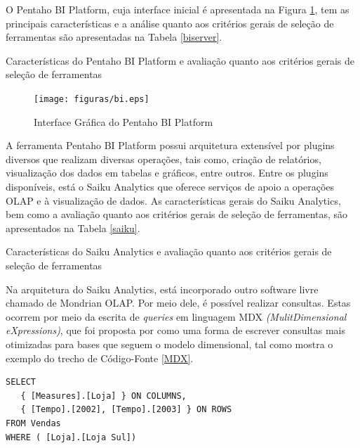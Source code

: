 O Pentaho BI Platform, cuja interface inicial é apresentada na Figura \ref{BIplatform}, tem as principais características e a análise quanto aos critérios gerais de seleção de ferramentas são apresentadas na Tabela \ref{biserver}. 


\begin{table}[!ht]

\caption{Características do Pentaho BI Platform e avaliação quanto aos critérios gerais de seleção de ferramentas}
\label{biserver}
\end{table}
\FloatBarrier



\begin{figure}[ht!]
\begin{center}
\texttt{[image: figuras/bi.eps]}
\caption{Interface Gráfica do Pentaho BI Platform}
\label{BIplatform}
\end{center}
\end{figure}
\FloatBarrier
 

A ferramenta Pentaho BI Platform possui arquitetura extensível por plugins diversos que realizam diversas operações, tais como, criação de relatórios, visualização dos dados em tabelas e gráficos, entre outros. Entre os plugins disponíveis, está o Saiku Analytics que oferece serviços de apoio a operações OLAP e à visualização de dados. As características gerais do Saiku Analytics, bem como a avaliação quanto aos critérios gerais de seleção de ferramentas, são apresentados na Tabela \ref{saiku}. 

\begin{table}[!ht]

\caption{Características do Saiku Analytics e avaliação quanto aos critérios gerais de seleção de ferramentas}
\label{saiku}
\end{table}
\FloatBarrier

Na arquitetura do Saiku Analytics, está incorporado outro software livre chamado de Mondrian OLAP. Por meio dele, é possível realizar  consultas. Estas ocorrem por meio da escrita de \textit{queries} em linguagem MDX \textit{(MulitDimensional eXpressions)}, que foi proposta por  como uma forma de escrever consultas mais otimizadas para bases que seguem o modelo dimensional, tal como mostra o exemplo do trecho de Código-Fonte \ref{MDX}.


\begin{center}
\begin{minipage}{0.5\textwidth}

\begin{lstlisting}[caption=Exemplo de \textit{Query} em linguagem MDX, label=MDX]
 SELECT
   { [Measures].[Loja] } ON COLUMNS,
   { [Tempo].[2002], [Tempo].[2003] } ON ROWS
FROM Vendas
WHERE ( [Loja].[Loja Sul]) 

\end{lstlisting}
\end{minipage}
\end{center}
\FloatBarrier

